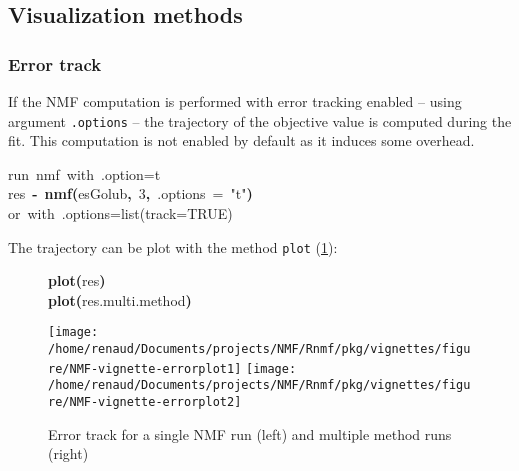 \documentclass[a4paper]{article}\usepackage{graphicx, color}
\makeatletter
\newcommand{\hlnumber}[1]{\textcolor[rgb]{0,0,0}{#1}}%
\newcommand{\hlfunctioncall}[1]{\textcolor[rgb]{0.501960784313725,0,0.329411764705882}{\textbf{#1}}}%
\newcommand{\hlstring}[1]{\textcolor[rgb]{0.6,0.6,1}{#1}}%
\newcommand{\hlkeyword}[1]{\textcolor[rgb]{0,0,0}{\textbf{#1}}}%
\newcommand{\hlargument}[1]{\textcolor[rgb]{0.690196078431373,0.250980392156863,0.0196078431372549}{#1}}%
\newcommand{\hlcomment}[1]{\textcolor[rgb]{0.180392156862745,0.6,0.341176470588235}{#1}}%
\newcommand{\hlassignement}[1]{\textcolor[rgb]{0,0,0}{\textbf{#1}}}%
\newcommand{\hlsymbol}[1]{\textcolor[rgb]{0,0,0}{#1}}%
\newcommand{\hlstd}[1]{\textcolor[rgb]{0,0,0}{#1}}%
\newenvironment{kframe}{%
 \def\FrameCommand##1{\hskip\@totalleftmargin \hskip-\fboxsep
 \colorbox{shadecolor}{##1}\hskip-\fboxsep
     \hskip-\linewidth \hskip-\@totalleftmargin \hskip\columnwidth}%
 \MakeFramed {\advance\hsize-\width
   \@totalleftmargin\z@ \linewidth\hsize
   \@setminipage}}%
 {\par\unskip\endMakeFramed}
\newenvironment{knitrout}{}{} %
\let\code=\texttt
\makeatother
\begin{document}
\subsection{Visualization methods}

\subsubsection*{Error track}

If the NMF computation is performed with error tracking enabled -- using argument \code{.options} -- the trajectory of the objective value is computed during the fit.
This computation is not enabled by default as it induces some overhead. 

\begin{knitrout}
\color{fgcolor}\begin{kframe}
\begin{flushleft}
\ttfamily\noindent
\hlcomment{\usebox{\hlnormalsizeboxhash}{\ }run{\ }nmf{\ }with{\ }.option=\usebox{\hlnormalsizeboxsinglequote}t\usebox{\hlnormalsizeboxsinglequote}}\hspace*{\fill}\\
\hlstd{}\hlsymbol{res}{\ }\hlassignement{\usebox{\hlnormalsizeboxlessthan}-}{\ }\hlfunctioncall{nmf}\hlkeyword{(}\hlsymbol{esGolub}\hlkeyword{,}{\ }\hlnumber{3}\hlkeyword{,}{\ }\hlargument{.options}{\ }\hlargument{=}{\ }\hlstring{"{}t"{}}\hlkeyword{)}\hspace*{\fill}\\
\hlstd{}\hlcomment{\usebox{\hlnormalsizeboxhash}{\ }or{\ }with{\ }.options=list(track=TRUE)}\mbox{}
\normalfont
\end{flushleft}
\end{kframe}
\end{knitrout}


The trajectory can be plot with the method \code{plot} (\cref{fig:errorplot}):
\begin{figure}
\begin{knitrout}
\color{fgcolor}\begin{kframe}
\begin{flushleft}
\ttfamily\noindent
\hlfunctioncall{plot}\hlkeyword{(}\hlsymbol{res}\hlkeyword{)}\hspace*{\fill}\\
\hlstd{}\hlfunctioncall{plot}\hlkeyword{(}\hlsymbol{res.multi.method}\hlkeyword{)}\mbox{}
\normalfont
\end{flushleft}
\end{kframe}\texttt{[image: /home/renaud/Documents/projects/NMF/Rnmf/pkg/vignettes/figure/NMF-vignette-errorplot1]} \texttt{[image: /home/renaud/Documents/projects/NMF/Rnmf/pkg/vignettes/figure/NMF-vignette-errorplot2]} 
\end{knitrout}

\caption{Error track for a single NMF run (left) and multiple method
runs (right)}
\label{fig:errorplot}
\end{figure}
\end{document}
